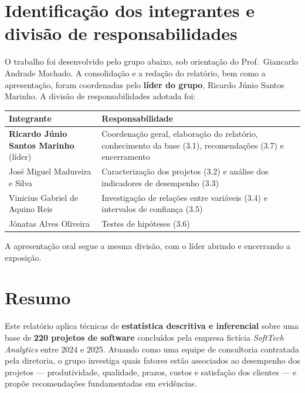 \documentclass[a4paper, 12pt]{article}
\begin{document}
\newpage
{}

\section{Identificação dos integrantes e divisão de responsabilidades}

O trabalho foi desenvolvido pelo grupo abaixo, sob orientação do
Prof.\ Giancarlo Andrade Machado. A consolidação e a redação do relatório, bem
como a apresentação, foram coordenadas pelo \textbf{líder do grupo}, Ricardo
Júnio Santos Marinho. A divisão de responsabilidades adotada foi:

\begin{table}[H]
\centering
\begin{tabularx}{\textwidth}{@{} l L @{}}
\toprule
\textbf{Integrante} & \textbf{Responsabilidade} \\
\midrule
\textbf{Ricardo Júnio Santos Marinho} (líder) & Coordenação geral, elaboração do
relatório, conhecimento da base (3.1), recomendações (3.7) e encerramento \\
José Miguel Madureira e Silva & Caracterização dos projetos (3.2) e análise dos
indicadores de desempenho (3.3) \\
Vinicius Gabriel de Aquino Reis & Investigação de relações entre variáveis (3.4)
e intervalos de confiança (3.5) \\
Jônatas Alves Oliveira & Testes de hipóteses (3.6) \\
\bottomrule
\end{tabularx}
\end{table}

\noindent A apresentação oral segue a mesma divisão, com o líder abrindo e
encerrando a exposição.

\section{Resumo}

Este relatório aplica técnicas de \textbf{estatística descritiva e inferencial}
sobre uma base de \textbf{220 projetos de software} concluídos pela empresa
fictícia \emph{SoftTech Analytics} entre 2024 e 2025. Atuando como uma equipe de
consultoria contratada pela diretoria, o grupo investiga quais fatores estão
associados ao desempenho dos projetos --- produtividade, qualidade, prazos,
custos e satisfação dos clientes --- e propõe recomendações fundamentadas em
evidências.
\end{document}
